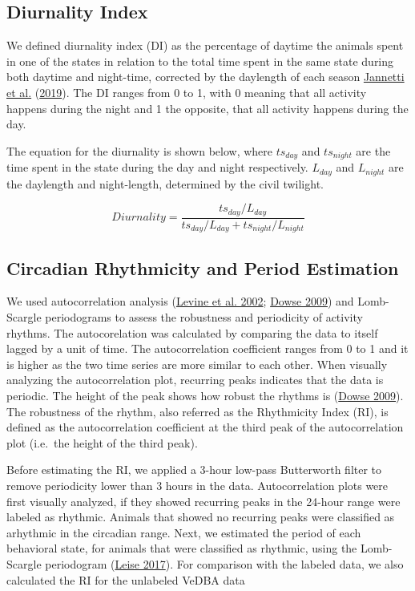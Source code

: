 \documentclass[english,msc,numbers,hidelinks]{coppe}
\begin{document}
  \hypertarget{diurnality-index}{%
  \subsection{Diurnality Index}\label{diurnality-index}}

  We defined diurnality index (DI) as the percentage of daytime the animals spent in one of the states in relation to the total time spent in the same state during both daytime and night-time, corrected by the daylength of each season \protect\hyperlink{ref-jannetti2019}{Jannetti et al.} (\protect\hyperlink{ref-jannetti2019}{2019}). The DI ranges from 0 to 1, with 0 meaning that all activity happens during the night and 1 the opposite, that all activity happens during the day.

  The equation for the diurnality is shown below, where \(ts_{day}\) and \(ts_{night}\) are the time spent in the state during the day and night respectively. \(L_{day}\) and \(L_{night}\) are the daylength and night-length, determined by the civil twilight.

  \[
  Diurnality = \frac{ts_{day}/L_{day}}{ts_{day}/L_{day} + ts_{night}/L_{night}}
  \]

  \hypertarget{circadian-rhythmicity-and-period-estimation}{%
  \subsection{Circadian Rhythmicity and Period Estimation}\label{circadian-rhythmicity-and-period-estimation}}

  We used autocorrelation analysis (\protect\hyperlink{ref-levine2002}{Levine et al. 2002}; \protect\hyperlink{ref-dowse2009}{Dowse 2009}) and Lomb-Scargle periodograms to assess the robustness and periodicity of activity rhythms. The autocorelation was calculated by comparing the data to itself lagged by a unit of time. The autocorrelation coefficient ranges from 0 to 1 and it is higher as the two time series are more similar to each other. When visually analyzing the autocorrelation plot, recurring peaks indicates that the data is periodic. The height of the peak shows how robust the rhythms is (\protect\hyperlink{ref-dowse2009}{Dowse 2009}). The robustness of the rhythm, also referred as the Rhythmicity Index (RI), is defined as the autocorrelation coefficient at the third peak of the autocorrelation plot (i.e.~the height of the third peak).

  Before estimating the RI, we applied a 3-hour low-pass Butterworth filter to remove periodicity lower than 3 hours in the data. Autocorrelation plots were first visually analyzed, if they showed recurring peaks in the 24-hour range were labeled as rhythmic. Animals that showed no recurring peaks were classified as arhythmic in the circadian range. Next, we estimated the period of each behavioral state, for animals that were classified as rhythmic, using the Lomb-Scargle periodogram (\protect\hyperlink{ref-leise2017}{Leise 2017}). For comparison with the labeled data, we also calculated the RI for the unlabeled VeDBA data
\end{document}
